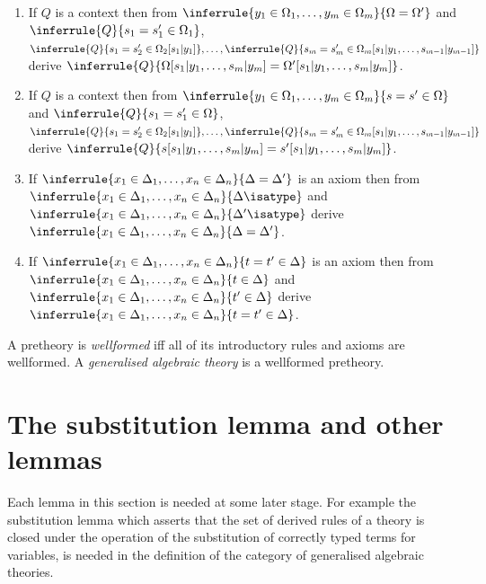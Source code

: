 \begin{definition}[2(b)]
\begin{enumerate}
    \item [SI1.] If $Q$ is a context then from $\inferrule{y_1\in\Omega_1,\ldots,y_m\in\Omega_m}{\Omega=\Omega'}$ and $\inferrule{Q}{s_1=s_1'\in\Omega_1}$, $\inferrule{Q}{s_1=s_2'\in\Omega_2[s_1|y_1]},\ldots,\inferrule{Q}{s_m=s_m'\in\Omega_m[s_1|y_1,\ldots,s_{m-1}|y_{m-1}]}$ derive $\inferrule{Q}{\Omega[s_1|y_1,\ldots,s_m|y_m]=\Omega'[s_1|y_1,\ldots,s_m|y_m]}$.
    \item [SI2.] If $Q$ is a context then from $\inferrule{y_1\in\Omega_1,\ldots,y_m\in\Omega_m}{s=s'\in\Omega}$ and $\inferrule{Q}{s_1=s_1'\in\Omega}$, $\inferrule{Q}{s_1=s_2'\in\Omega_2[s_1|y_1]},\ldots,\inferrule{Q}{s_m=s_m'\in\Omega_m[s_1|y_1,\ldots,s_{m-1}|y_{m-1}]}$ derive $\inferrule{Q}{s[s_1|y_1,\ldots,s_m|y_m]=s'[s_1|y_1,\ldots,s_m|y_m]}$.
    \item [A1.] If $\inferrule{x_1\in\Delta_1,\ldots,x_n\in\Delta_n}{\Delta=\Delta'}$ is an axiom then from $\inferrule{x_1\in\Delta_1,\ldots,x_n\in\Delta_n}{\Delta\isatype}$ and $\inferrule{x_1\in\Delta_1,\ldots,x_n\in\Delta_n}{\Delta'\isatype}$ derive $\inferrule{x_1\in\Delta_1,\ldots,x_n\in\Delta_n}{\Delta=\Delta'}$.
    \item [A2.] If $\inferrule{x_1\in\Delta_1,\ldots,x_n\in\Delta_n}{t=t'\in\Delta}$ is an axiom then from $\inferrule{x_1\in\Delta_1,\ldots,x_n\in\Delta_n}{t\in\Delta}$ and $\inferrule{x_1\in\Delta_1,\ldots,x_n\in\Delta_n}{t'\in\Delta}$ derive $\inferrule{x_1\in\Delta_1,\ldots,x_n\in\Delta_n}{t=t'\in\Delta}$.
  \end{enumerate}
\end{definition}

\begin{definition}[3]
  A pretheory is \emph{wellformed} iff all of its introductory rules and axioms are wellformed.
  A \emph{generalised algebraic theory} is a wellformed pretheory.
\end{definition}

\section{The substitution lemma and other lemmas} \label{sec:source-1-7}

Each lemma in this section is needed at some later stage.
%
For example the substitution lemma which asserts that the set of derived rules of a theory is closed under the operation of the substitution of correctly typed terms for variables, is needed in the definition of the category of generalised algebraic theories.

